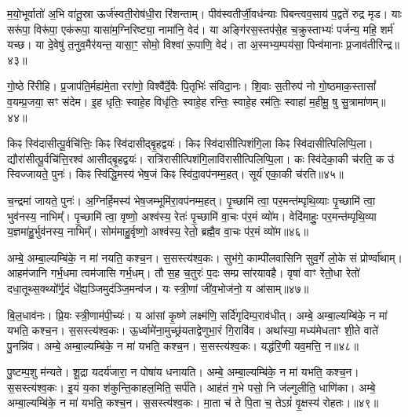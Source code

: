 {\anuvakamend[{नम॒ एका॒न्नत्रि॒ꣳ॒शत्॥16॥}]}

म॒यो॒भूर्वातो॑ अ॒भि वा॑तू॒स्रा ऊर्ज॑स्वती॒रोष॑धी॒रा रि॑शन्ताम्। पीव॑स्वतीर्जी॒वध॑न्याः पिबन्त्वव॒साय॑ प॒द्वते॑ रुद्र मृड। याः सरू॑पा॒ विरू॑पा॒ एक॑रूपा॒ यासा॑म॒ग्निरिष्ट्या॒ नामा॑नि॒ वेद॑। या अङ्गि॑रस॒स्तप॑से॒ह च॒क्रुस्ताभ्यः॑ पर्जन्य॒ महि॒ शर्म॑ यच्छ। या दे॒वेषु॑ त॒नुव॒मैर॑यन्त॒ यासा॒ꣳ॒ सोमो॒ विश्वा॑ रू॒पाणि॒ वेद॑। ता अ॒स्मभ्य॒म्पय॑सा॒ पिन्व॑मानाः प्र॒जाव॑तीरिन्द्र॥४३॥

गो॒ष्ठे रि॑रीहि। प्र॒जाप॑ति॒र्मह्य॑मे॒ता ररा॑णो॒ विश्वै᳚र्दे॒वैः पि॒तृभिः॑ संविदा॒नः। शि॒वाः स॒तीरुप॑ नो गो॒ष्ठमाक॒स्तासां᳚ व॒यम्प्र॒जया॒ सꣳ स॑देम। इ॒ह धृतिः॒ स्वाहे॒ह विधृ॑तिः॒ स्वाहे॒ह रन्तिः॒ स्वाहे॒ह रम॑तिः॒ स्वाहा॑ म॒हीमू॒ षु सु॒त्रामा॑णम्॥४४॥

{\anuvakamend[{इ॒न्द्रा॒ष्टात्रिꣳ॑शच्च॥17॥}]}

किꣴ स्वि॑दासीत्पू॒र्वचि॑त्तिः॒ किꣴ स्वि॑दासीद्बृ॒हद्वयः॑। किꣴ स्वि॑दासीत्पिशंगि॒ला किꣴ स्वि॑दासीत्पिलिप्पि॒ला। द्यौरा॑सीत्पू॒र्वचि॑त्ति॒रश्व॑ आसीद्बृ॒हद्वयः॑। रात्रि॑रासीत्पिशंगि॒लावि॑रासीत्पिलिप्पि॒ला। कः स्वि॑देका॒की च॑रति॒ क उ॑ स्विज्जायते॒ पुनः॑। किꣴ स्वि॑द्धि॒मस्य॑ भेष॒जं किꣴ स्वि॑दा॒वप॑नम्म॒हत्। सूर्य॑ एका॒की च॑रति॥४५॥

च॒न्द्रमा॑ जायते॒ पुनः॑। अ॒ग्निर्\mbox{}हि॒मस्य॑ भेष॒जम्भूमि॑रा॒वप॑नम्म॒हत्। पृ॒च्छामि॑ त्वा॒ पर॒मन्त॑म्पृथि॒व्याः पृ॒च्छामि॑ त्वा॒ भुव॑नस्य॒ नाभिम्᳚। पृ॒च्छामि॑ त्वा॒ वृष्णो॒ अश्व॑स्य॒ रेतः॑ पृ॒च्छामि॑ वा॒चः प॑र॒मं व्यो॑म। वेदि॑माहुः॒ पर॒मन्त॑म्पृथि॒व्या य॒ज्ञमा॑हु॒र्भुव॑नस्य॒ नाभिम्᳚। सोम॑माहु॒र्वृष्णो॒ अश्व॑स्य॒ रेतो॒ ब्रह्मै॒व वा॒चः प॑र॒मं व्यो॑म॥४६॥

{\anuvakamend[{सूर्य॑ एका॒की च॑रति॒ षट्च॑त्वारिꣳशच्च॥18॥}]}

अम्बे॒ अम्बा॒ल्यम्बि॑के॒ न मा॑ नयति॒ कश्च॒न। स॒सस्त्य॑श्व॒कः। सुभ॑गे॒ काम्पी॑लवासिनि सुव॒र्गे लो॒के सं प्रोर्ण्वा॑थाम्। आहम॑जानि गर्भ॒धमा त्वम॑जासि गर्भ॒धम्। तौ स॒ह च॒तुरः॑ प॒दः सम्प्र सा॑रयावहै। वृषा॑ वाꣳ रेतो॒धा रेतो॑ दधा॒तूथ्स॒क्थ्यो᳚र्गृ॒दं धे᳚ह्य॒ञ्जिमुद॑ञ्जि॒मन्व॑ज। यः स्त्री॒णां जी॑व॒भोज॑नो॒ य आ॑साम्॥४७॥

बि॒ल॒धाव॑नः। प्रि॒यः स्त्री॒णाम॑पी॒च्यः॑। य आ॑सां कृ॒ष्णे लक्ष्म॑णि॒ सर्दि॑गृदिम्प॒राव॑धीत्। अम्बे॒ अम्बा॒ल्यम्बि॑के॒ न मा॑ यभति॒ कश्च॒न। स॒सस्त्य॑श्व॒कः। ऊ॒र्ध्वामे॑ना॒मुच्छ्र॑यताद्वेणुभा॒रं गि॒रावि॑व। अथा᳚स्या॒ मध्य॑मेधताꣳ शी॒ते वाते॑ पु॒नन्नि॑व। अम्बे॒ अम्बा॒ल्यम्बि॑के॒ न मा॑ यभति॒ कश्च॒न। स॒सस्त्य॑श्व॒कः। यद्ध॑रि॒णी यव॒मत्ति॒ न॥४८॥

पु॒ष्टम्प॒शु म॑न्यते। शू॒द्रा यदर्य॑जारा॒ न पोषा॑य धनायति। अम्बे॒ अम्बा॒ल्यम्बि॑के॒ न मा॑ यभति॒ कश्च॒न। स॒सस्त्य॑श्व॒कः। इ॒यं य॒का श॑कुन्ति॒काहल॒मिति॒ सर्प॑ति। आह॑तं ग॒भे पसो॒ नि ज॑ल्गुलीति॒ धाणि॑का। अम्बे॒ अम्बा॒ल्यम्बि॑के॒ न मा॑ यभति॒ कश्च॒न। स॒सस्त्य॑श्व॒कः। मा॒ता च॑ ते पि॒ता च॒ ते\-ऽग्रं॑ वृ॒क्षस्य॑ रोहतः।॥४९॥

